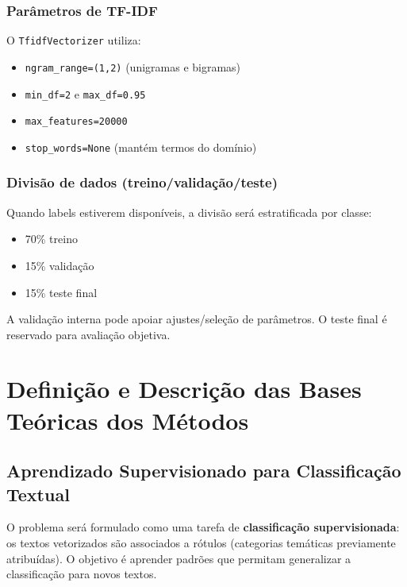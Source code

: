 \documentclass[12pt,a4paper]{article}
\begin{document}
\subsubsection{Parâmetros de TF-IDF}

O \texttt{TfidfVectorizer} utiliza:

\begin{itemize}[leftmargin=1.2cm]
    \item \texttt{ngram\_range=(1,2)} (unigramas e bigramas)
    \item \texttt{min\_df=2} e \texttt{max\_df=0.95}
    \item \texttt{max\_features=20000}
    \item \texttt{stop\_words=None} (mantém termos do domínio)
\end{itemize}

\subsubsection{Divisão de dados (treino/validação/teste)}

Quando labels estiverem disponíveis, a divisão será estratificada por classe:

\begin{itemize}[leftmargin=1.2cm]
    \item 70\% treino
    \item 15\% validação
    \item 15\% teste final
\end{itemize}

A validação interna pode apoiar ajustes/seleção de parâmetros. O teste final é reservado para avaliação objetiva.

\clearpage
\section{Definição e Descrição das Bases Teóricas dos Métodos}

\subsection{Aprendizado Supervisionado para Classificação Textual}

O problema será formulado como uma tarefa de \textbf{classificação supervisionada}: os textos vetorizados são associados a rótulos (categorias temáticas previamente atribuídas). O objetivo é aprender padrões que permitam generalizar a classificação para novos textos.
\end{document}
